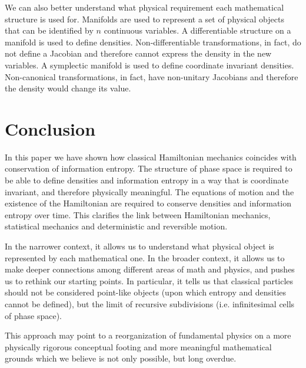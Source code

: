 \documentclass[11pt]{elsarticle}
\begin{document}
We can also better understand what physical requirement each mathematical structure is used for. Manifolds are used to represent a set of physical objects that can be identified by $n$ continuous variables.  A differentiable structure on a manifold is used to define densities. Non-differentiable transformations, in fact, do not define a Jacobian and therefore cannot express the density in the new variables. A symplectic manifold is used to define coordinate invariant densities. Non-canonical transformations, in fact, have non-unitary Jacobians and therefore the density would change its value.

\section{Conclusion}

In this paper we have shown how classical Hamiltonian mechanics coincides with conservation of information entropy. The structure of phase space is required to be able to define densities and information entropy in a way that is coordinate invariant, and therefore physically meaningful. The equations of motion and the existence of the Hamiltonian are required to conserve densities and information entropy over time. This clarifies the link between Hamiltonian mechanics, statistical mechanics and deterministic and reversible motion.

In the narrower context, it allows us to understand what physical object is represented by each mathematical one. In the broader context, it allows us to make deeper connections among different areas of math and physics, and pushes us to rethink our starting points. In particular, it tells us that classical particles should not be considered point-like objects (upon which entropy and densities cannot be defined), but the limit of recursive subdivisions (i.e. infinitesimal cells of phase space).

This approach may point to a reorganization of fundamental physics on a more physically rigorous conceptual footing and more meaningful mathematical grounds which we believe is not only possible, but long overdue.



{}
\end{document}

